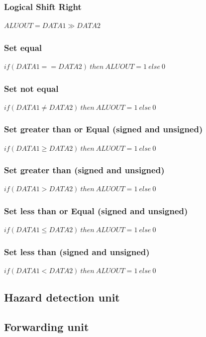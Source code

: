 \subsubsection{Logical Shift Right}
$ \mathit{ALUOUT} = \mathit{DATA1} \gg \mathit{DATA2} $

\subsubsection{Set equal}
$ \mathit{if (DATA1 == DATA2) \: then} \: \mathit{ALUOUT} = 1 \: \mathit{else} \: 0 $

\subsubsection{Set not equal}
$ \mathit{if (DATA1 \neq DATA2) \: then} \: \mathit{ALUOUT} = 1 \: \mathit{else} \: 0 $

\subsubsection{Set greater than or Equal (signed and unsigned)}
$ \mathit{if (DATA1 \geq DATA2) \: then} \: \mathit{ALUOUT} = 1 \: \mathit{else} \: 0 $

\subsubsection{Set greater than (signed and unsigned)}
$ \mathit{if (DATA1 > DATA2) \: then} \: \mathit{ALUOUT} = 1 \: \mathit{else} \: 0 $

\subsubsection{Set less than or Equal (signed and unsigned)}
$ \mathit{if (DATA1 \leq DATA2) \: then} \: \mathit{ALUOUT} = 1 \: \mathit{else} \: 0 $

\subsubsection{Set less than (signed and unsigned)}
$ \mathit{if (DATA1 < DATA2) \: then} \: \mathit{ALUOUT} = 1 \: \mathit{else} \: 0 $

\subsection{Hazard detection unit}
\subsection{Forwarding unit}